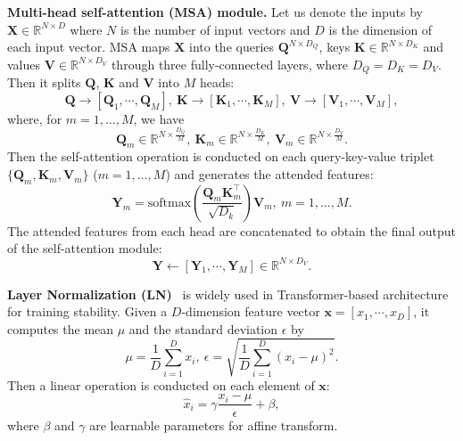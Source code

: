 \documentclass{bmvc2k}
\begin{document}
\vspace{0.1in}
\noindent \textbf{Multi-head self-attention (MSA) module.} Let us denote the inputs by $\mathbf{X} \in \mathbb{R}^{N \times D}$ where $N$ is the number of input vectors and $D$ is the dimension of each input vector. MSA maps $\mathbf{X}$ into the queries $\mathbf{Q}^{N\times D_Q}$, keys $\mathbf{K} \in \mathbb{R}^{N\times D_K}$ and values $\mathbf{V}\in \mathbb{R}^{N\times D_V}$ through three fully-connected layers, where $D_Q = D_K = D_V$. Then it splits $\mathbf{Q}$, $\mathbf{K}$ and $\mathbf{V}$ into $M$ heads:
\begin{equation*}
    \mathbf{Q} \to [\mathbf{Q}_1,\cdots, \mathbf{Q}_M],~\mathbf{K} \to [\mathbf{K}_1,\cdots, \mathbf{K}_M],~\mathbf{V} \to [\mathbf{V}_1,\cdots, \mathbf{V}_M],
\end{equation*}
where, for $m = 1, \dots, M$, we have
\begin{equation*}
    \mathbf{Q}_m \in \mathbb{R}^{N\times \frac{D_Q}{M}},~\mathbf{K}_m \in \mathbb{R}^{N\times \frac{D_K}{M}},~\mathbf{V}_m \in \mathbb{R}^{N\times \frac{D_V}{M}}.
\end{equation*}
Then the self-attention operation is conducted on each query-key-value triplet  $\{\mathbf{Q}_m, \mathbf{K}_m, \mathbf{V}_m\}$ ($m = 1,\dots,M$) and generates the attended features:
\begin{equation*}
    \mathbf{Y}_m =  \mathrm{softmax}(\frac{\mathbf{Q}_m\mathbf{K}^{\top}_m}{\sqrt{D_k}}) \mathbf{V}_m,~ m = 1,\dots,M.
\end{equation*}
The attended features from each head are concatenated to obtain the final output of the self-attention module:
\begin{equation*}
    \mathbf{Y} \gets [\mathbf{Y}_1,\cdots,\mathbf{Y}_M] \in \mathbb{R}^{N \times D_V}.
\end{equation*}

\noindent \textbf{Layer Normalization (LN)}~\cite{ba2016layer} is widely used in Transformer-based architecture for training stability.  Given a $D$-dimension feature vector $\mathbf{x}  = [x_1,\cdots,x_D]$, it  computes the mean $\mu$ and the standard deviation $\epsilon$ by
\begin{equation*}
\mu = \frac{1}{D}\sum_{i=1}^D x_i,~\epsilon = \sqrt{\frac{1}{D}\sum_{i=1}^D (x_i-\mu)^2}.
\end{equation*}
Then a linear operation is conducted on each element of $\mathbf{x}$:
\begin{equation}
    \hat{x}_i = \gamma \frac{x_i-\mu}{\epsilon} + \beta,
\end{equation}
where $\beta$ and $\gamma$ are learnable parameters for affine transform.
\end{document}

